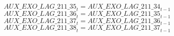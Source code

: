\begin{dmath}
{AUX\_EXO\_LAG\_211\_35}_{t}={AUX\_EXO\_LAG\_211\_34}_{t-1}
\end{dmath}
\begin{dmath}
{AUX\_EXO\_LAG\_211\_36}_{t}={AUX\_EXO\_LAG\_211\_35}_{t-1}
\end{dmath}
\begin{dmath}
{AUX\_EXO\_LAG\_211\_37}_{t}={AUX\_EXO\_LAG\_211\_36}_{t-1}
\end{dmath}
\begin{dmath}
{AUX\_EXO\_LAG\_211\_38}_{t}={AUX\_EXO\_LAG\_211\_37}_{t-1}
\end{dmath}
